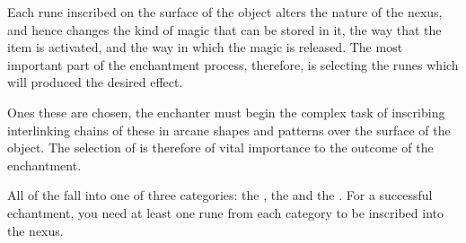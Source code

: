 Each rune inscribed on the surface of the object alters the nature of the nexus, and hence changes the kind of magic that can be stored in it, the way that the item is activated, and the way in which the magic is released. The most important part of the enchantment process, therefore, is selecting the runes which will produced the desired effect.

Ones these  are chosen, the enchanter must begin the complex task of inscribing interlinking chains of these  in arcane shapes and patterns over the surface of the object.  The selection of  is therefore of vital importance to the outcome of the enchantment. 


All of the  fall into one of three categories: the , the  and the . For a successful echantment, you need at least one rune from each category to be inscribed into the nexus. 



\newcommand\runeRow[3]
{
	\rune{#2}	&	#1	&		\small #3 \\
}
\newcommand\esoRow[3]
{
	\runeRow{#1}{#2}{Used to contain magic associated with the \key{#3} discipline.}
}

\newcommand\runeList[3]
{
	\subsection{#1}

	#2

	\begin{center}
		\begin{rndtable}{c l p {6 cm} }
			\bf Rune	&	\bf Name	&	\bf Description
			\\
			
			#3
		\end{rndtable}
	\end{center}
}






